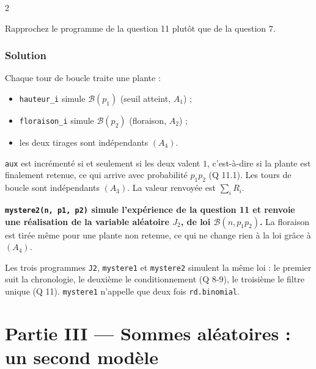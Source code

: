 \documentclass[11pt,a4paper]{article}
\providecommand{\tightlist}{\setlength{\itemsep}{0pt}\setlength{\parskip}{0pt}}
\begin{document}
\begin{indication}{2}

Rapprochez le programme de la question 11 plutôt que de la question 7.

\end{indication}

\hypertarget{solution-25}{%
\subsubsection{Solution}\label{solution-25}}

Chaque tour de boucle traite une plante :

\begin{itemize}
\tightlist
\item
  \texttt{hauteur\_i} simule \(\mathcal B(p_1)\) (seuil atteint, \(A_1\)) ;
\item
  \texttt{floraison\_i} simule \(\mathcal B(p_2)\) (floraison, \(A_2\)) ;
\item
  les deux tirages sont indépendants \((A_4)\).
\end{itemize}

\texttt{aux} est incrémenté si et seulement si les deux valent \(1\), c'est-à-dire si la plante est finalement retenue, ce qui arrive avec probabilité \(p_1p_2\) (Q 11.1). Les tours de boucle sont indépendants \((A_3)\). La valeur renvoyée est \(\sum_iR_i\).

\textbf{\texttt{mystere2(\allowbreak{}n,\allowbreak{}\ p1,\allowbreak{}\ p2)\allowbreak{}} simule l'expérience de la question 11 et renvoie une réalisation de la variable aléatoire \(J_2\), de loi \(\mathcal B(n,p_1p_2)\).} La floraison est tirée même pour une plante non retenue, ce qui ne change rien à la loi grâce à \((A_4)\).

\begin{methode}

Les trois programmes \texttt{J2}, \texttt{mystere1} et \texttt{mystere2} simulent la même loi : le premier suit la chronologie, le deuxième le conditionnement (Q 8-9), le troisième le filtre unique (Q 11). \texttt{mystere1} n'appelle que deux fois \texttt{rd.binomial}.

\end{methode}

\hypertarget{partie-iii-sommes-aluxe9atoires-un-second-moduxe8le}{%
\section{Partie III --- Sommes aléatoires : un second modèle}\label{partie-iii-sommes-aluxe9atoires-un-second-moduxe8le}}
\end{document}
